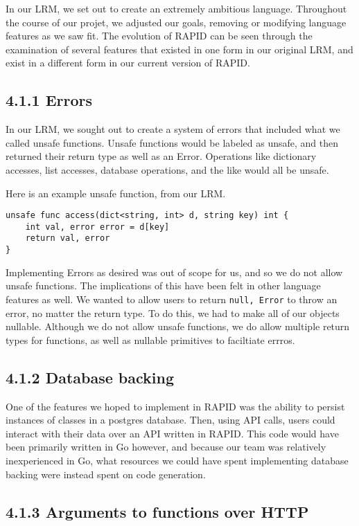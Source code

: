 In our LRM, we set out to create an extremely ambitious language.  Throughout
the course of our projet, we adjusted our goals, removing or modifying language
features as we saw fit.  The evolution of RAPID can be seen through the
examination of several features that existed in one form in our original LRM,
and exist in a different form in our current version of RAPID.

\subsection*{4.1.1 Errors}

In our LRM, we sought out to create a system of errors that included what we
called unsafe functions.  Unsafe functions would be labeled as unsafe, and then
returned their return type as well as an Error.  Operations like dictionary
accesses, list accesses, database operations, and the like would all be unsafe.

Here is an example unsafe function, from our LRM.

\begin{verbatim}
unsafe func access(dict<string, int> d, string key) int {
    int val, error error = d[key]
    return val, error
}
\end{verbatim}

Implementing Errors as desired was out of scope for us, and so we do not allow
unsafe functions.
The implications of this have been felt in other language features as well. We
wanted to allow users to return \texttt{null, Error} to throw an error, no
matter the return type.  To do this, we had to make all of our objects nullable.
Although we do not allow unsafe functions, we do allow multiple return types
for functions, as well as nullable primitives to faciltiate errros.

\subsection*{4.1.2 Database backing}

One of the features we hoped to implement in RAPID was the ability to persist
instances of classes in a postgres database.  Then, using API calls, users
could interact with their data over an API written in RAPID.  This code would
have been primarily written in Go however, and because our team was relatively
inexperienced in Go, what resources we could have spent implementing database
backing were instead spent on code generation.

\subsection*{4.1.3 Arguments to functions over HTTP}

